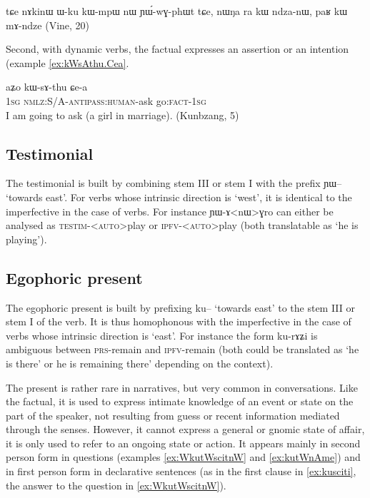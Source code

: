 \documentclass[oldfontcommands,oneside,a4paper,11pt]{article}
\newcommand{\ipa}[1]{{\phon \mbox{#1}}} %
\begin{document}
\ipa{tɕe}  	\ipa{nɤkinɯ}  	\ipa{ɯ-ku}  	\ipa{kɯ-mpɯ}  	\ipa{nɯ}  	\ipa{ɲɯ́-wɣ-phɯt}  	\ipa{tɕe,}  \ipa{nɯŋa}  	\ipa{ra}  	\ipa{kɯ}  	\ipa{ndza-nɯ,}  	\ipa{paʁ}  	\ipa{kɯ}  	\ipa{mɤ-ndze}  
(Vine, 20)



Second, with dynamic verbs, the factual expresses an assertion or an intention (example \ref{ex:kWsAthu.Cea}. 

\begin{exe}
\ex \label{ex:kWsAthu.Cea}
\gll
\ipa{aʑo}  	\ipa{kɯ-sɤ-thu}  	\ipa{ɕe-a}  \\
\textsc{1sg} \textsc{nmlz}:S/A-\textsc{antipass:human}-ask go:\textsc{fact}-\textsc{1sg} \\
\glt I am going to ask (a girl in marriage). (Kunbzang, 5)
\end{exe}

 \subsection{Testimonial }
The testimonial  is built by combining stem III or stem I with the prefix \ipa{ɲɯ--} `towards east'.  For verbs whose intrinsic direction is `west', it is identical to the imperfective in the case of verbs. For instance \ipa{ɲɯ-ɤ<nɯ>ɣro} can either be analysed as \textsc{testim-<auto>}play or \textsc{ipfv-<auto>}play (both translatable as `he is playing').



\subsection{Egophoric present }
The egophoric present  is built by prefixing \ipa{ku--} `towards east' to the stem III or stem I of the verb. It is thus homophonous with the imperfective in the case of verbs whose intrinsic direction is `east'.  For instance the form \ipa{ku-rɤʑi} is ambiguous between \textsc{prs}-remain and \textsc{ipfv}-remain (both could be translated as `he is there' or he is remaining there' depending on the context).

The present  is rather rare in narratives, but very common in conversations. Like the factual, it is used to express intimate knowledge of an event or state on the part of the speaker, not resulting from guess or recent information mediated through the senses. However,  it cannot express a general or gnomic state of affair, it is only used to refer to an ongoing state or action. It appears mainly in second person form in questions (examples \ref{ex:WkutWscitnW} and \ref{ex:kutWnAme}) and in first person form in declarative sentences (as in the first clause in \ref{ex:kusciti}, the answer to the question in \ref{ex:WkutWscitnW}).  
\end{document}
